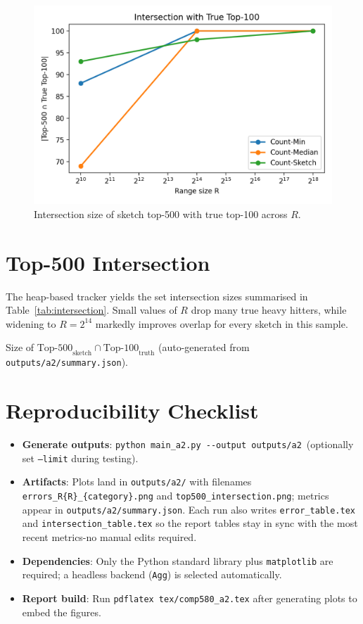 \documentclass[11pt]{article}
\begin{document}
\begin{figure}[H]
  \centering
  \includegraphics[width=0.55\linewidth]{../outputs/a2/top500_intersection.png}
  \caption{Intersection size of sketch top-500 with true top-100 across $R$.}
  \label{fig:top500}
\end{figure}

\section{Top-500 Intersection}
The heap-based tracker yields the set intersection sizes summarised in Table~\ref{tab:intersection}. Small values of $R$ drop many true heavy hitters, while widening to $R=2^{14}$ markedly improves overlap for every sketch in this sample.

\begin{table}[H]
  \centering
  \caption{Size of $\text{Top-500}_{\text{sketch}} \cap \text{Top-100}_{\text{truth}}$ (auto-generated from \texttt{outputs/a2/summary.json}).}
  \label{tab:intersection}
  
\end{table}

\section{Reproducibility Checklist}
\begin{itemize}
  \item \textbf{Generate outputs}: \verb|python main_a2.py --output outputs/a2|\ (optionally set \texttt{--limit} during testing).
  \item \textbf{Artifacts}: Plots land in \texttt{outputs/a2/} with filenames \texttt{errors\_R\{R\}\_\{category\}.png} and \texttt{top500\_intersection.png}; metrics appear in \texttt{outputs/a2/summary.json}. Each run also writes \texttt{error\_table.tex} and \texttt{intersection\_table.tex} so the report tables stay in sync with the most recent metrics-no manual edits required.
  \item \textbf{Dependencies}: Only the Python standard library plus \texttt{matplotlib} are required; a headless backend (\texttt{Agg}) is selected automatically.
  \item \textbf{Report build}: Run \verb|pdflatex tex/comp580_a2.tex| after generating plots to embed the figures.
\end{itemize}
\end{document}
